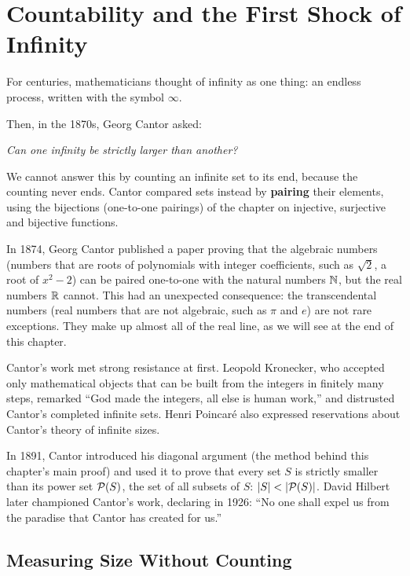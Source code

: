\section{Countability and the First Shock of Infinity}
\chapterline

For centuries, mathematicians thought of infinity as one thing: an endless process, written with the symbol $\infty$.

Then, in the 1870s, Georg Cantor asked:
\begin{center}
\emph{Can one infinity be strictly larger than another?}
\end{center}

We cannot answer this by counting an infinite set to its end, because the counting never ends. Cantor compared sets instead by \textbf{pairing} their elements, using the bijections (one-to-one pairings) of the chapter on injective, surjective and bijective functions.

\begin{historybox}
In 1874, Georg Cantor published a paper proving that the algebraic numbers (numbers that are roots of polynomials with integer coefficients, such as $\sqrt{2}$, a root of $x^2 - 2$) can be paired one-to-one with the natural numbers $\mathbb{N}$, but the real numbers $\mathbb{R}$ cannot. This had an unexpected consequence: the transcendental numbers (real numbers that are not algebraic, such as $\pi$ and $e$) are not rare exceptions. They make up almost all of the real line, as we will see at the end of this chapter.

Cantor's work met strong resistance at first. Leopold Kronecker, who accepted only mathematical objects that can be built from the integers in finitely many steps, remarked ``God made the integers, all else is human work,'' and distrusted Cantor's completed infinite sets. Henri Poincar\'e also expressed reservations about Cantor's theory of infinite sizes.

In 1891, Cantor introduced his diagonal argument (the method behind this chapter's main proof) and used it to prove that every set $S$ is strictly smaller than its power set $\mathcal{P}(S)$, the set of all subsets of $S$: $|S| < |\mathcal{P}(S)|$. David Hilbert later championed Cantor's work, declaring in 1926: ``No one shall expel us from the paradise that Cantor has created for us.''
\end{historybox}

\subsection{Measuring Size Without Counting}

